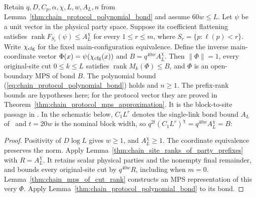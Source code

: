 \begin{lemma}
    \label{thm:chain_protocol_mps_of_prefix_ranks}
    \leanok
    Retain $q,D,C_p,\alpha,\chi,L,w,A_L,n$ from
    Lemma~\ref{thm:chain_protocol_polynomial_bond} and assume
    $60w\le L$. Let $\psi$ be a unit vector in the physical
    party space. Suppose its coefficient flattening satisfies
    $\operatorname{rank}F_{S_r}(\psi)\le A_L^{\chi}$ for every
    $1\le r\le m$, where $S_r=\{p:\ell(p)<r\}$.
    Write $\chi_{\rm cfg}$ for the fixed main-configuration equivalence.
    Define the inverse main-coordinate vector
    $\Phi(x)=\psi(\chi_{\rm cfg}(x))$ and $B=q^{40w}A_L^{\chi}$.
    Then $\|\Phi\|=1$, every original-site cut $0\le k\le L$
    satisfies $\operatorname{rank}M_k(\Phi)\le B$, and $\Phi$
    is an open-boundary MPS of bond $B$. The polynomial bound
    (\ref{eq:chain_protocol_polynomial_bond}) holds and $n\ge1$.
    The prefix-rank bounds are hypotheses here; for the protocol vector
    they are proved in Theorem~\ref{thm:chain_protocol_mps_approximation}.
    It is the block-to-site passage in
    \cite[Part~II, end of the proof of Theorem~B]{TNLean2026OneDimensional}.
    In the schematic below, $C_1L^r$ denotes the single-link bond bound $A_L$
    of~\cite{TNLean2026OneDimensional} and $t=20w$ is the nominal block width,
    so $q^{2t}(C_1L^r)^\chi=q^{40w}A_L^\chi=B$:
    
\end{lemma}
\begin{proof}\leanok
    Positivity of $D\log L$ gives $w\ge1$, and $A_L^{\chi}\ge1$.
    The coordinate equivalence preserves the norm.
    Apply Lemma~\ref{thm:chain_site_ranks_of_party_prefixes} with
    $R=A_L^{\chi}$. It retains scalar physical parties and the
    nonempty final remainder, and bounds every original-site cut by
    $q^{40w}R$, including when $m=0$.
    Lemma~\ref{thm:chain_mps_of_cut_rank} constructs an MPS
    representation of this very $\Phi$. Apply
    Lemma~\ref{thm:chain_protocol_polynomial_bond} to its bond.
\end{proof}


